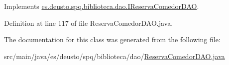 Implements \mbox{\hyperlink{interfacees_1_1deusto_1_1spq_1_1biblioteca_1_1dao_1_1_i_reserva_comedor_d_a_o_ae20ad98f69700d0c47c0cb274e1f0e33}{es.\+deusto.\+spq.\+biblioteca.\+dao.\+I\+Reserva\+Comedor\+D\+AO}}.



Definition at line 117 of file Reserva\+Comedor\+D\+A\+O.\+java.



The documentation for this class was generated from the following file\+:\begin{DoxyCompactItemize}
\item 
src/main/java/es/deusto/spq/biblioteca/dao/\mbox{\hyperlink{_reserva_comedor_d_a_o_8java}{Reserva\+Comedor\+D\+A\+O.\+java}}\end{DoxyCompactItemize}
